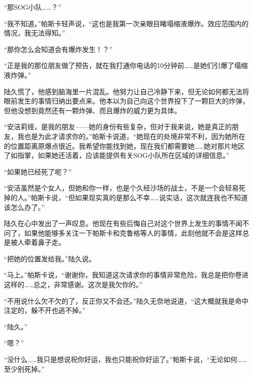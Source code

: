 “那SOG小队……？”

“我不知道。”帕斯卡轻声说，“这也是我第一次亲眼目睹塌缩液爆炸。效应范围内的情况，我无法得知。”

“那你怎么会知道会有爆炸发生！？”

“正是我的那位朋友做了预告，就在我打通你电话的10分钟前……是她们引爆了塌缩液炸弹。”

陆久慌了，他感到脑海里一片混乱。他努力让自己冷静下来，但无论如何都无法将眼前发生的事情归纳出要点来。他本以为自己向这个世界投下了一颗巨大的炸弹，但他没想到竟然还有一颗炸弹、而且爆炸的威力更为具体。

“安洁莉娅，是我的朋友——她的身份有些复杂，但对于我来说，她是真正的朋友，我也是为此才请求你的。”帕斯卡说道，“她现在的处境非常不利，因为她所在的位置距离原爆点很近。我希望你能找到她，现在我们都需要她……她对那片地区了如指掌，如果她还活着，应该能提供有关SOG小队所在区域的详细信息。”

“如果她已经死了呢？”

“安洁虽然是个女人，但她和你一样，也是个久经沙场的战士，不是一个会轻易死掉的人。”帕斯卡说，“但如果现实真的是那么不幸……说实话，这次就连我也不知道该怎么办了。”

陆久在心中发出了一声叹息。他现在有些后悔自己对这个世界上发生的事情不闻不问了，如果他能够多关注一下帕斯卡和克鲁格等人的事情，此刻他就不会是这样总是被人牵着鼻子走。

“把她的位置发给我。”陆久说。

“马上。”帕斯卡说，“谢谢你，我知道这次请求你的事情非常危险，我总是把你卷进这样的……总之，非常感谢。这次是我欠你的。”

“不用说什么欠不欠的了，反正你又不会还。”陆久无奈地说道，“这大概就我是命中注定的，躲不开也逃不掉。”

“陆久。”

“嗯？”

“没什么……我只是想说祝你好运，我也只能祝你好运了。”帕斯卡说，“无论如何……至少别死掉。”